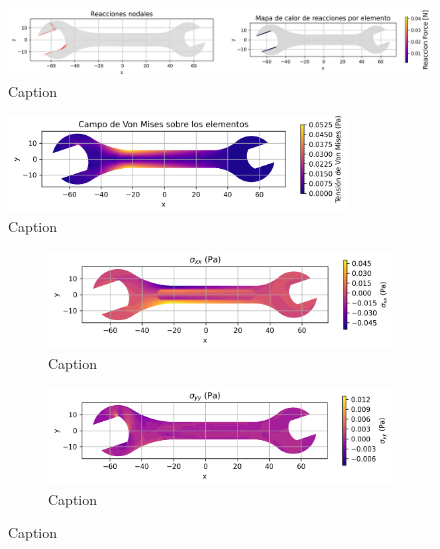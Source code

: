 \begin{figure}[H]
  \centering
  \includegraphics[width=1\textwidth]{GRAFICOS/Case d_deformada_reacciones.png}
  \caption{Caption}
  \label{fig:principal}
\end{figure}

\begin{figure}[H]
  \centering
  \includegraphics[width=0.8\textwidth]{GRAFICOS/Case d_von_mises.png}
  \caption{Caption}
  \label{fig:principal}
\end{figure}

\begin{figure}[H]
  \centering
  \begin{subfigure}[t]{0.49\textwidth}
    \centering
    \includegraphics[width=\textwidth]{GRAFICOS/Case d - sigma_xx.png}
    \caption{Caption}
    \label{fig:deformada_reacciones}
  \end{subfigure}
  \hfill
  \begin{subfigure}[t]{0.49\textwidth}
    \centering
    \includegraphics[width=\textwidth]{GRAFICOS/Case d - sigma_yy.png}
    \caption{Caption}
    \label{fig:von_mises}
  \end{subfigure}
  \caption{Caption}
  \label{fig:analisis_estructural}
\end{figure}

